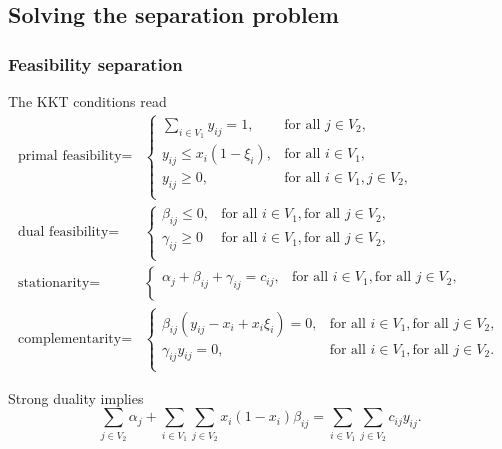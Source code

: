 \subsection{Solving the separation problem}

\subsubsection{Feasibility separation}

The KKT conditions read 
\begin{align*}
    \text{primal feasibility} = & 
    \begin{cases}
        \sum_{i\in V_1} y_{ij} = 1, & \text{for all } j\in V_2, \\
        y_{ij} \le x_i(1 - \xi_i), & \text{for all } i\in V_1,  \\
        y_{ij} \ge 0, & \text{for all } i\in V_1, j\in V_2,  \\
    \end{cases} \\
    \text{dual feasibility} = & 
    \begin{cases}
        \beta_{ij} \le 0, & \text{for all } i\in V_1, \text{for all } j\in V_2, \\
        \gamma_{ij} \ge 0 & \text{for all } i\in V_1, \text{for all } j\in V_2, \\
    \end{cases} \\
    \text{stationarity} = & 
    \begin{cases}
        \alpha_j + \beta_{ij} + \gamma_{ij} = c_{ij}, & \text{for all } i\in V_1, \text{for all } j\in V_2, \\
    \end{cases} \\
    \text{complementarity} = & 
    \begin{cases}
        \beta_{ij}( y_{ij} - x_i + x_i\xi_i ) = 0, & \text{for all } i\in V_1, \text{for all } j\in V_2, \\
        \gamma_{ij}y_{ij} = 0, & \text{for all } i\in V_1, \text{for all } j\in V_2. \\
    \end{cases}
\end{align*}

Strong duality implies 
\begin{equation*}
    \sum_{j\in V_2} \alpha_j + \sum_{i\in V_1} \sum_{j\in V_2} x_i(1 - x_i) \beta_{ij} = \sum_{i\in V_1} \sum_{j\in V_2} c_{ij} y_{ij}.
\end{equation*}

